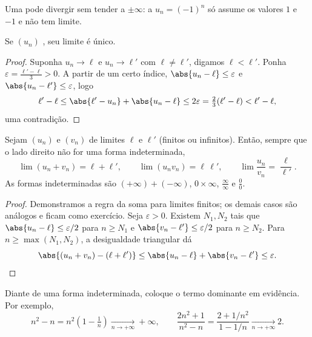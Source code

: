 \begin{remark}
Uma  pode divergir sem tender a $\pm\infty$: a 
$u_n = (-1)^n$ só assume os valores $1$ e $-1$ e não tem limite.
\end{remark}

\begin{proposition}\label{prop:g12:seq:uniqueness}
Se $(u_n)$ , seu limite é único.
\end{proposition}

\begin{proof}
Suponha $u_n \to \ell$ e $u_n \to \ell'$ com $\ell \neq \ell'$, digamos
$\ell < \ell'$. Ponha $\varepsilon = \frac{\ell' - \ell}{3} > 0$. A partir
de um certo índice, $\abs{u_n - \ell} \leq \varepsilon$ e
$\abs{u_n - \ell'} \leq \varepsilon$, logo
\[
\ell' - \ell \leq \abs{\ell' - u_n} + \abs{u_n - \ell}
\leq 2\varepsilon = \tfrac{2}{3}(\ell' - \ell) < \ell' - \ell,
\]
uma contradição.
\end{proof}

\begin{proposition}\label{prop:g12:seq:operations}
Sejam $(u_n)$ e $(v_n)$  de limites $\ell$ e $\ell'$ (finitos ou
infinitos). Então, sempre que o lado direito não for uma forma
indeterminada,
\[
\lim (u_n + v_n) = \ell + \ell', \qquad
\lim (u_n v_n) = \ell\,\ell', \qquad
\lim \frac{u_n}{v_n} = \frac{\ell}{\ell'}.
\]
As formas indeterminadas são $(+\infty) + (-\infty)$,
$0 \times \infty$, $\frac{\infty}{\infty}$ e $\frac{0}{0}$.
\end{proposition}

\begin{proof}
Demonstramos a regra da soma para limites finitos; os demais casos são
análogos e ficam como exercício. Seja $\varepsilon > 0$. Existem
$N_1, N_2$ tais que $\abs{u_n - \ell} \leq \varepsilon/2$ para
$n \geq N_1$ e $\abs{v_n - \ell'} \leq \varepsilon/2$ para $n \geq N_2$.
Para $n \geq \max(N_1, N_2)$, a desigualdade triangular dá
\[
\abs{(u_n + v_n) - (\ell + \ell')}
\leq \abs{u_n - \ell} + \abs{v_n - \ell'} \leq \varepsilon. \qedhere
\]
\end{proof}

\begin{method}\label{met:g12:seq:indeterminate}
Diante de uma forma indeterminada, coloque o termo dominante em
evidência. Por exemplo,
\[
n^2 - n = n^2\left(1 - \tfrac{1}{n}\right) \xrightarrow[n\to+\infty]{} +\infty,
\qquad
\frac{2n^2+1}{n^2 - n} = \frac{2 + 1/n^2}{1 - 1/n}
\xrightarrow[n\to+\infty]{} 2 .
\]
\end{method}

